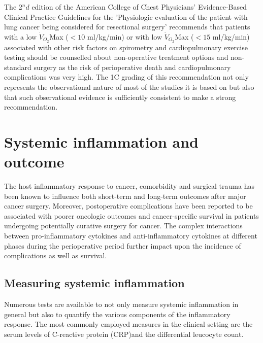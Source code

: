 The 2$^nd$ edition of the American College of Chest Physicians' Evidence-Based Clinical Practice Guidelines for the 'Physiologic evaluation of the patient with lung cancer being considered for resectional surgery' recommends that patients with a low $\dot{V}_{O_2}$Max ($<10$ ml/kg/min) or with low $\dot{V}_{O_2}$Max ($<15$ ml/kg/min) associated with other risk factors on spirometry and cardiopulmonary exercise testing should be counselled about non-operative treatment options and non-standard surgery as the risk of perioperative death and cardiopulmonary complications was very high. The 1C grading of this recommendation not only represents the observational nature of most of the studies it is based on but also that such observational evidence is sufficiently consistent\parencite{benzo_complications_2007} to make a strong recommendation.\parencite{colice_physiologic_2007}

\clearpage

\section{Systemic inflammation and outcome}
\label{sec:intro_systemic_inflammation_outcome}


The host inflammatory response to cancer, comorbidity and surgical trauma has been known to influence both short-term and long-term outcomes after major cancer surgery. Moreover, postoperative complications have been reported to be associated with poorer oncologic outcomes and cancer-specific survival in patients undergoing potentially curative surgery for cancer. The complex interactions between pro-inflammatory cytokines and anti-inflammatory cytokines at different phases during the perioperative period further impact upon the incidence of complications as well as survival.

\subsection{Measuring systemic inflammation}
Numerous tests are available to not only measure systemic inflammation in general but also to quantify the various components of the inflammatory response. The most commonly employed measures in the clinical setting are the serum levels of C-reactive protein (CRP)and the differential leucocyte count. 

